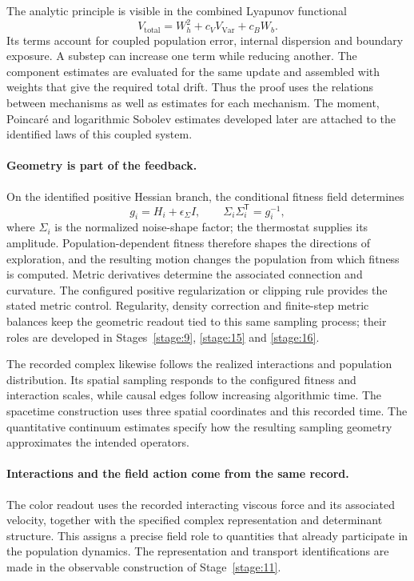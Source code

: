 \documentclass[11pt,a4paper]{article}
\begin{document}
The analytic principle is visible in the combined Lyapunov functional
\[
V_{\mathrm{total}}
 =W_h^2+c_VV_{\mathrm{Var}}+c_BW_b.
\]
Its terms account for coupled population error, internal dispersion and
boundary exposure. A substep can increase one term while reducing another.
The component estimates are evaluated for the same update and assembled
with weights that give the required total drift. Thus the proof uses the
relations between mechanisms as well as estimates for each mechanism.
The moment, Poincar\'e and logarithmic Sobolev estimates developed later
are attached to the identified laws of this coupled system.

\paragraph{Geometry is part of the feedback.}
On the identified positive Hessian branch, the conditional fitness field
determines
\[
g_i=H_i+\epsilon_\Sigma I,
\qquad \Sigma_i\Sigma_i^{\mathsf T}=g_i^{-1},
\]
where \(\Sigma_i\) is the normalized noise-shape factor; the thermostat
supplies its amplitude. Population-dependent fitness therefore shapes the
directions of exploration, and the resulting motion changes the population
from which fitness is computed. Metric derivatives determine the associated
connection and curvature. The configured positive regularization or clipping
rule provides the stated metric control. Regularity, density correction and
finite-step metric balances keep the geometric readout tied to this same
sampling process; their roles are developed in
Stages~\ref{stage:9}, \ref{stage:15} and \ref{stage:16}.

The recorded complex likewise follows the realized interactions and
population distribution. Its spatial sampling responds to the configured
fitness and interaction scales, while causal edges follow increasing
algorithmic time. The spacetime construction uses three spatial coordinates
and this recorded time. The quantitative continuum estimates specify how
the resulting sampling geometry approximates the intended operators.

\paragraph{Interactions and the field action come from the same record.}
The color readout uses the recorded interacting viscous force and its
associated velocity, together with the specified complex representation
and determinant structure. This assigns a precise field role to quantities
that already participate in the population dynamics. The representation and
transport identifications are made in the observable construction of
Stage~\ref{stage:11}.
\end{document}
